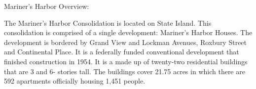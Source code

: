 Mariner's Harbor Overview:        

      

The Mariner's Harbor Consolidation is located on State Island. This consolidation is comprised of a single development: Mariner's Harbor Houses. The development is bordered by Grand View and Lockman Avenues, Roxbury Street and Continental Place. It is a federally funded conventional development that finished construction in 1954. It is a made up of twenty-two residential buildings that are 3 and 6- stories tall. The buildings cover 21.75 acres in which there are 592 apartments officially housing 1,451 people.